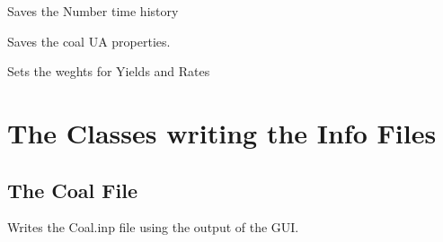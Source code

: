 \documentclass[letterpaper,10pt,english]{sphinxmanual}
\begin{document}
\begin{fulllineitems}
\begin{fulllineitems}
\end{fulllineitems}


\begin{fulllineitems}
\label{GUI:GUI.InfosFromGUI.setTimeHistories}
Saves the Number time history

\end{fulllineitems}


\begin{fulllineitems}
\label{GUI:GUI.InfosFromGUI.setUA}
Saves the coal UA properties.

\end{fulllineitems}


\begin{fulllineitems}
\label{GUI:GUI.InfosFromGUI.setWeightYR}
Sets the weghts for Yields and Rates

\end{fulllineitems}


\end{fulllineitems}



\section{The Classes writing the Info Files}
\label{GUI:the-classes-writing-the-info-files}

\subsection{The Coal File}
\label{GUI:the-coal-file}

\begin{fulllineitems}
\label{GUI:writeInfoFiles.WriteCoalFile}
Writes the Coal.inp file using the output of the GUI.

\end{fulllineitems}
\end{document}
